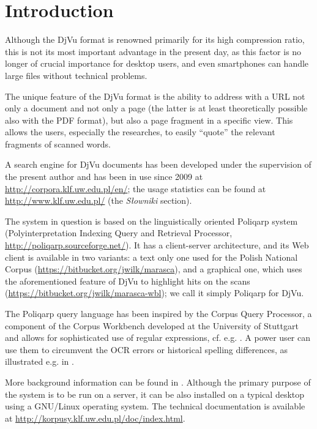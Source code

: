 \documentclass[runningheads,a4paper]{llncs}
\begin{document}
\section{Introduction}

Although the DjVu format is renowned primarily for its high
compression ratio, this is not its most important advantage in the
present day, as this factor is no longer of crucial importance for
desktop users, and even smartphones can handle large files without
technical problems.

The unique feature of the DjVu format is the ability to address with
a URL not only a document and not only a page (the latter is at least
theoretically possible also with the PDF format), but also a page
fragment in a specific view. This allows the users, especially the
researches, to easily “quote” the relevant fragments of scanned
words. 

A search engine for DjVu documents has been developed under the
supervision of the present author and has been in use since 2009 at
\url{http://corpora.klf.uw.edu.pl/en/}; the usage statistics can be
found at \url{http://www.klf.uw.edu.pl/} (the \textit{Słowniki}
section).

The system in question is based on the linguistically oriented
Poliqarp system (Polyinterpretation Indexing Query and Retrieval
Processor, \url{http://poliqarp.sourceforge.net/}). It has a
client-server architecture, and its Web client is available in two
variants: a text only one used for the Polish National Corpus
(\url{https://bitbucket.org/jwilk/marasca}), and a graphical one,
which uses the aforementioned feature of DjVu to highlight hits on
the scans (\url{https://bitbucket.org/jwilk/marasca-wbl}); we call it
simply Poliqarp for DjVu.

The Poliqarp query language has been inspired by the Corpus Query
Processor, a component of the Corpus Workbench developed at the
University of Stuttgart and allows for sophisticated use of regular
expressions, cf. e.g. \cite{etal04}. A power user can use them to
circumvent the OCR errors or historical spelling differences, as
illustrated e.g. in \cite{JSB2014CS}.

More background information can be found in
\cite{JSB2011LNCS}. Although the primary purpose of the system is to
be run on a server, it can be also installed on a typical desktop
using a GNU/Linux operating system. The technical documentation is
available at \url{http://korpusy.klf.uw.edu.pl/doc/index.html}.
\end{document}
